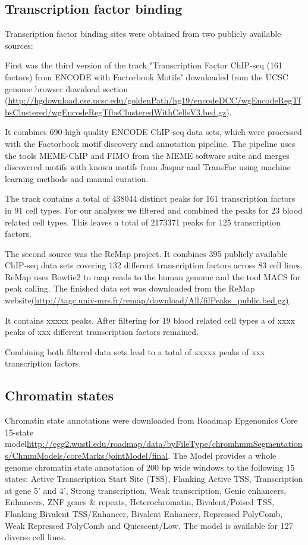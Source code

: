 \documentclass[a4paper,12pt]{article}
\begin{document}
\subsection{Transcription factor binding}
Transcription factor binding sites were obtained from two publicly available sources: 

First was the third version of the track "Transcription Factor ChIP-seq (161 factors) from ENCODE with Factorbook Motifs"\cite{10.1101/gr.139105.112} downloaded from the UCSC genome browser download section (\url{http://hgdownload.cse.ucsc.edu/goldenPath/hg19/encodeDCC/wgEncodeRegTfbsClustered/wgEncodeRegTfbsClusteredWithCellsV3.bed.gz}).

It combines 690 high quality ENCODE ChIP-seq data sets, which were processed with the Factorbook motif discovery and annotation pipeline\cite{10.1101/gr.139105.112}. The pipeline uses the tools MEME-ChIP\cite{10.1093/bioinformatics/btr189} and FIMO\cite{10.1093/bioinformatics/btr064} from the MEME software suite and merges discovered motifs with known motifs from Jaspar\cite{10.1093/nar/gkx1126} and TransFac\cite{10.1093/nar/gkj143} using machine learning methods and manual curation. 

The track contains a total of 438044 distinct peaks for 161 transcription factors in 91 cell types. For our analyses we filtered and combined the peaks for 23 blood related cell types. This leaves a total of 2173371 peaks for 125 transcription factors.  

The second source was the ReMap project\cite{10.1093/nar/gku1280}. It combines 395 publicly available ChIP-seq data sets covering 132 different transcription factors across 83 cell lines. ReMap uses Bowtie2\cite{} to map reads to the human genome and the tool MACS\cite{} for peak calling. The finished data set was downloaded from the ReMap website\url{(http://tagc.univ-mrs.fr/remap/download/All/filPeaks_public.bed.gz)}.

It contains xxxxx peaks. After filtering for 19 blood related cell types a of xxxx peaks of xxx different transcription factors remained. 

Combining both filtered data sets lead to a total of xxxxx peaks of xxx transcription factors.


\subsection{Chromatin states}
Chromatin state annotations were downloaded from Roadmap Epgenomics Core 15-state model\url{http://egg2.wustl.edu/roadmap/data/byFileType/chromhmmSegmentations/ChmmModels/coreMarks/jointModel/final}. The Model provides a whole genome chromatin state annotation of 200 bp wide windows to the following 15 states: Active Transcription Start Site (TSS), Flanking Active TSS, Transcription at gene 5' and 4', Strong transcription, Weak transcription, Genic enhancers, Enhancers, ZNF genes \& repeats, Heterochromatin, Bivalent/Poised TSS, Flanking Bivalent TSS/Enhancer, Bivalent Enhancer, Repressed PolyComb, Weak Repressed PolyComb and Quiescent/Low. The model is available for 127 diverse cell lines. 
\end{document}
